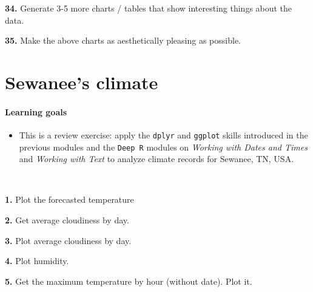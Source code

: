\documentclass[]{book}
\newenvironment{Shaded}{\begin{snugshade}}{\end{snugshade}}
\newcommand{\DataTypeTok}[1]{\textcolor[rgb]{0.13,0.29,0.53}{#1}}
\newcommand{\KeywordTok}[1]{\textcolor[rgb]{0.13,0.29,0.53}{\textbf{#1}}}
\newcommand{\NormalTok}[1]{#1}
\newcommand{\OperatorTok}[1]{\textcolor[rgb]{0.81,0.36,0.00}{\textbf{#1}}}
\newcommand{\StringTok}[1]{\textcolor[rgb]{0.31,0.60,0.02}{#1}}
\providecommand{\tightlist}{%
  \setlength{\itemsep}{0pt}\setlength{\parskip}{0pt}}
\begin{document}
\textbf{34.} Generate 3-5 more charts / tables that show interesting things about the data.

\textbf{35.} Make the above charts as aesthetically pleasing as possible.

\hypertarget{sewanees-climate}{%
\chapter{Sewanee's climate}\label{sewanees-climate}}

\hypertarget{learning-goals-20}{%
\subsubsection*{Learning goals}\label{learning-goals-20}}

\begin{itemize}
\tightlist
\item
  This is a review exercise: apply the \texttt{dplyr} and \texttt{ggplot} skills introduced in the previous modules and the \texttt{Deep\ R} modules on \emph{Working with Dates and Times} and \emph{Working with Text} to analyze climate records for Sewanee, TN, USA.
\end{itemize}

~

\begin{Shaded}
\end{Shaded}

\textbf{1.} Plot the forecasted temperature

\textbf{2.} Get average cloudiness by day.

\textbf{3.} Plot average cloudiness by day.

\textbf{4.} Plot humidity.

\textbf{5.} Get the maximum temperature by hour (without date). Plot it.
\end{document}
